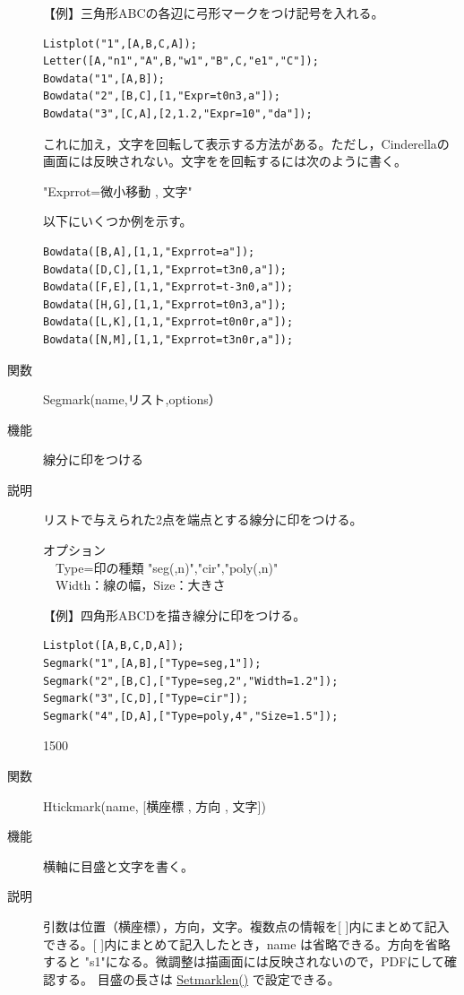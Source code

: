 \documentclass[papersize,a4paper,10pt,uplatex]{jsarticle}
\begin{document}
\begin{description}
【例】三角形ABCの各辺に弓形マークをつけ記号を入れる。
\begin{verbatim}
Listplot("1",[A,B,C,A]);
Letter([A,"n1","A",B,"w1","B",C,"e1","C"]);
Bowdata("1",[A,B]);
Bowdata("2",[B,C],[1,"Expr=t0n3,a"]);
Bowdata("3",[C,A],[2,1.2,"Expr=10","da"]);
\end{verbatim}

\vspace{\baselineskip}
これに加え，文字を回転して表示する方法がある。ただし，Cinderellaの画面には反映されない。文字をを回転するには次のように書く。

\hspace{10mm}"Exprrot=微小移動 , 文字"

以下にいくつか例を示す。
\begin{verbatim}
Bowdata([B,A],[1,1,"Exprrot=a"]);
Bowdata([D,C],[1,1,"Exprrot=t3n0,a"]);
Bowdata([F,E],[1,1,"Exprrot=t-3n0,a"]);
Bowdata([H,G],[1,1,"Exprrot=t0n3,a"]);
Bowdata([L,K],[1,1,"Exprrot=t0n0r,a"]);
Bowdata([N,M],[1,1,"Exprrot=t3n0r,a"]);
\end{verbatim}
\hspace{10mm} \scalebox{0.7}{}


\hypertarget{segmark}{}
\item[関数]Segmark(name,リスト,options）
\item[機能]線分に印をつける
\item[説明]リストで与えられた2点を端点とする線分に印をつける。

オプション\\
　Type=印の種類 "seg(,n)","cir","poly(,n)"\\
　Width：線の幅，Size：大きさ

【例】四角形ABCDを描き線分に印をつける。

\begin{verbatim}
Listplot([A,B,C,D,A]);
Segmark("1",[A,B],["Type=seg,1"]); 
Segmark("2",[B,C],["Type=seg,2","Width=1.2"]);
Segmark("3",[C,D],["Type=cir"]);
Segmark("4",[D,A],["Type=poly,4","Size=1.5"]);
\end{verbatim}

\begin{layer}{150}{0}
\end{layer}


\hypertarget{htickmark}{}
\item[関数]Htickmark(name, [横座標 , 方向 , 文字])
\item[機能]横軸に目盛と文字を書く。
\item[説明]引数は位置（横座標），方向，文字。複数点の情報を[ ]内にまとめて記入できる。[ ]内にまとめて記入したとき，name は省略できる。方向を省略すると "s1"になる。微調整は描画面には反映されないので，PDFにして確認する。
目盛の長さは \hyperlink{setmarklen}{Setmarklen()} で設定できる。


\end{description}
\end{document}
